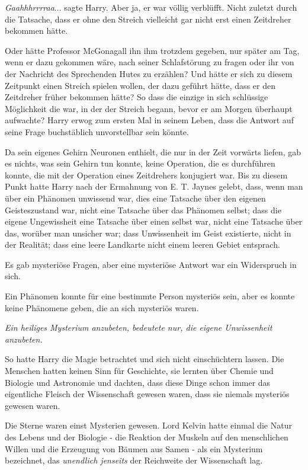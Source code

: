 \glqq{}\emph{Gaahhhrrrraa}...\grqq{} sagte Harry. Aber ja, er war völlig
verblüfft. Nicht zuletzt durch die Tatsache, dass er ohne den Streich vielleicht
gar nicht erst einen Zeitdreher bekommen hätte.

Oder hätte Professor McGonagall ihn ihm trotzdem gegeben, nur später am Tag,
wenn er dazu gekommen wäre, nach seiner Schlafstörung zu fragen oder ihr von der
Nachricht des Sprechenden Hutes zu erzählen? Und hätte er sich zu diesem
Zeitpunkt einen Streich spielen wollen, der dazu geführt hätte, dass er den
Zeitdreher früher bekommen hätte? So dass die einzige in sich schlüssige
Möglichkeit die war, in der der Streich begann, bevor er am Morgen überhaupt
aufwachte? Harry erwog zum ersten Mal in seinem Leben, dass die Antwort auf
seine Frage buchstäblich unvorstellbar sein könnte.

Da sein eigenes Gehirn Neuronen enthielt, die nur in der Zeit vorwärts liefen,
gab es nichts, was sein Gehirn tun konnte, keine Operation, die es durchführen
konnte, die mit der Operation eines Zeitdrehers konjugiert war. Bis zu diesem
Punkt hatte Harry nach der Ermahnung von E. T. Jaynes gelebt, dass, wenn man
über ein Phänomen unwissend war, dies eine Tatsache über den eigenen
Geisteszustand war, nicht eine Tatsache über das Phänomen selbst; dass die
eigene Ungewissheit eine Tatsache über einen selbst war, nicht eine Tatsache
über das, worüber man unsicher war; dass Unwissenheit im Geist existierte, nicht
in der Realität; dass eine leere Landkarte nicht einem leeren Gebiet entsprach.

Es gab mysteriöse Fragen, aber eine mysteriöse Antwort war ein Widerspruch in
sich.

Ein Phänomen konnte für eine bestimmte Person mysteriös sein, aber es konnte
keine Phänomene geben, die an sich mysteriös waren.

\emph{Ein heiliges Mysterium anzubeten, bedeutete nur, die eigene Unwissenheit
anzubeten.}

So hatte Harry die Magie betrachtet und sich nicht einschüchtern lassen. Die
Menschen hatten keinen Sinn für Geschichte, sie lernten über Chemie und Biologie
und Astronomie und dachten, dass diese Dinge schon immer das eigentliche Fleisch
der Wissenschaft gewesen waren, dass sie niemals mysteriös gewesen waren.

Die Sterne waren einst Mysterien gewesen. Lord Kelvin hatte einmal die Natur des
Lebens und der Biologie - die Reaktion der Muskeln auf den menschlichen Willen
und die Erzeugung von Bäumen aus Samen - als ein Mysterium bezeichnet, das
\emph{\glqq{}unendlich jenseits\grqq{}} der Reichweite der Wissenschaft lag.


